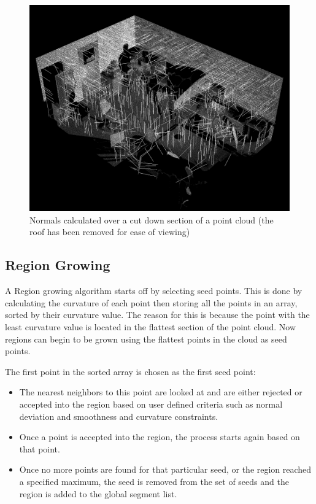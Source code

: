 			\begin{figure}[H]
			\centering
			\includegraphics[width=0.7\linewidth]{Includes/images/Normals}
			\caption{Normals calculated over a cut down section of a point cloud (the roof has been removed for ease of viewing)}
			\label{fig:Normals}
			\end{figure}
		

				
	\subsection{Region Growing}
	
		
		A Region growing algorithm starts off by selecting seed points. This is done by calculating the curvature of each point then storing all the points in an array, sorted by their curvature value. The reason for this is because the point with the least curvature value is located in the flattest section of the point cloud. Now regions can begin to be grown using the flattest points in the cloud as seed points. 
		
		The first point in the sorted array is chosen as the first seed point:
		
		\begin{itemize}
			
			\item The nearest neighbors to this point are looked at and are either rejected or accepted into the region based on user defined criteria such as normal deviation and smoothness and curvature constraints.
			
			\item Once a point is accepted into the region, the process starts again based on that point.
			
			\item Once no more points are found for that particular seed, or the region reached a specified maximum, the seed is removed from the set of seeds and the region is added to the global segment list. 
			
		\end{itemize}
		
